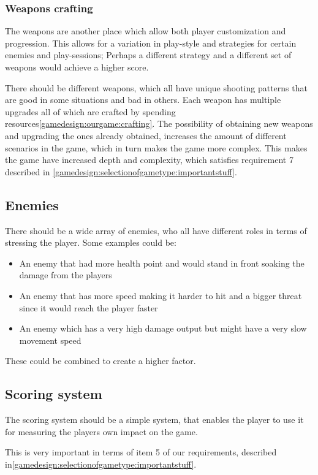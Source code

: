 \subsubsection*{Weapons crafting}\label{gamedesign:ourgame:weapons}
The weapons are another place which allow both player customization and progression. This allows for a variation in play-style and strategies for certain enemies and play-sessions; Perhaps a different strategy and a different set of weapons would achieve a higher score.

There should be different weapons, which all have unique shooting patterns that are good in some situations and bad in others.
Each weapon has multiple upgrades all of which are crafted by spending resources\ref{gamedesign:ourgame:crafting}. The possibility of obtaining new weapons and upgrading the ones already obtained, increases the amount of different scenarios in the game, which in turn makes the game more complex. This makes the game have increased depth and complexity, which satisfies requirement 7 described in \ref{gamedesign:selectionofgametype:importantstuff}.

\subsection{Enemies}
There should be a wide array of enemies, who all have different roles in terms of stressing the player.
Some examples could be:
\begin{itemize}
\item An enemy that had more health point and would stand in front soaking the damage from the players
\item An enemy that has more speed making it harder to hit and a bigger threat since it would reach the player faster
\item An enemy which has a very high damage output but might have a very slow movement speed
\end{itemize}
These could be combined to create a higher factor.

\subsection{Scoring system}\label{gamedesign:ourgame:scoring}
The scoring system should be a simple system, that enables the player to use it for measuring the players own impact on the game.

This is very important in terms of item 5 of our requirements, described in\ref{gamedesign:selectionofgametype:importantstuff}.